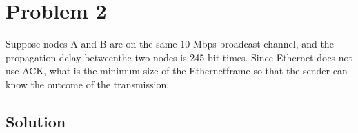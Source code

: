 
\section*{Problem 2}

Suppose nodes A and B are on the same 10 Mbps broadcast channel, and the propagation delay betweenthe two nodes is 245 bit times.
Since Ethernet does not use ACK, what is the minimum size of the Ethernetframe so that the sender can know the outcome of the transmission.

\subsection*{Solution}
